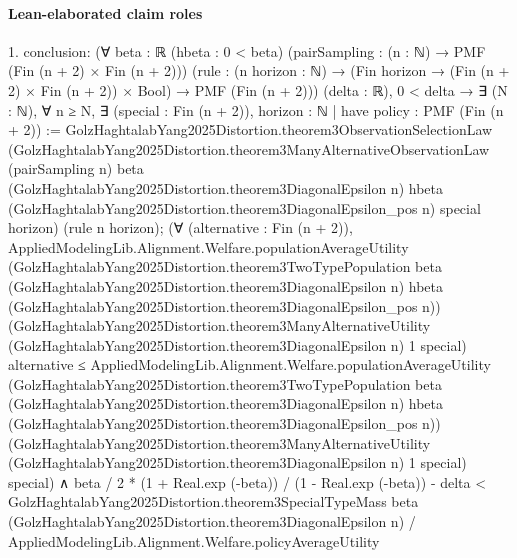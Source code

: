 \documentclass[10pt]{article}
\begin{document}
\paragraph{Lean-elaborated claim roles}\begin{ReviewVerbatim}
1. conclusion: (∀ {beta : ℝ} (hbeta : 0 < beta) (pairSampling : (n : ℕ) → PMF (Fin (n + 2) × Fin (n + 2)))
    (rule : (n horizon : ℕ) → (Fin horizon → (Fin (n + 2) × Fin (n + 2)) × Bool) → PMF (Fin (n + 2))) (delta : ℝ),
    0 < delta →
      ∃ (N : ℕ),
        ∀ n ≥ N,
          ∃ (special : Fin (n + 2)),
            {horizon : ℕ |
                have policy : PMF (Fin (n + 2)) :=
                  GolzHaghtalabYang2025Distortion.theorem3ObservationSelectionLaw
                    (GolzHaghtalabYang2025Distortion.theorem3ManyAlternativeObservationLaw (pairSampling n) beta
                      (GolzHaghtalabYang2025Distortion.theorem3DiagonalEpsilon n) hbeta
                      (GolzHaghtalabYang2025Distortion.theorem3DiagonalEpsilon_pos n) special horizon)
                    (rule n horizon);
                (∀ (alternative : Fin (n + 2)),
                    AppliedModelingLib.Alignment.Welfare.populationAverageUtility
                        (GolzHaghtalabYang2025Distortion.theorem3TwoTypePopulation beta
                          (GolzHaghtalabYang2025Distortion.theorem3DiagonalEpsilon n) hbeta
                          (GolzHaghtalabYang2025Distortion.theorem3DiagonalEpsilon_pos n))
                        (GolzHaghtalabYang2025Distortion.theorem3ManyAlternativeUtility
                          (GolzHaghtalabYang2025Distortion.theorem3DiagonalEpsilon n) 1 special)
                        alternative ≤
                      AppliedModelingLib.Alignment.Welfare.populationAverageUtility
                        (GolzHaghtalabYang2025Distortion.theorem3TwoTypePopulation beta
                          (GolzHaghtalabYang2025Distortion.theorem3DiagonalEpsilon n) hbeta
                          (GolzHaghtalabYang2025Distortion.theorem3DiagonalEpsilon_pos n))
                        (GolzHaghtalabYang2025Distortion.theorem3ManyAlternativeUtility
                          (GolzHaghtalabYang2025Distortion.theorem3DiagonalEpsilon n) 1 special)
                        special) ∧
                  beta / 2 * (1 + Real.exp (-beta)) / (1 - Real.exp (-beta)) - delta <
                    GolzHaghtalabYang2025Distortion.theorem3SpecialTypeMass beta
                        (GolzHaghtalabYang2025Distortion.theorem3DiagonalEpsilon n) /
                      AppliedModelingLib.Alignment.Welfare.policyAverageUtility
}
\end{ReviewVerbatim}
\end{document}
